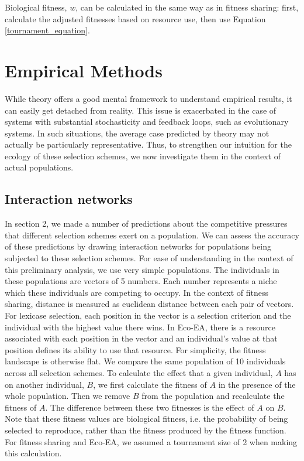 Biological fitness, $w$, can be calculated in the same way as in fitness sharing: first, calculate the adjusted fitnesses based on resource use, then use Equation \ref{tournament_equation}. 

\section{Empirical Methods}

While theory offers a good mental framework to understand empirical results, it can easily get detached from reality. This issue is exacerbated in the case of systems with substantial stochasticity and feedback loops, such as evolutionary systems. In such situations, the average case predicted by theory may not actually be particularly representative. Thus, to strengthen our intuition for the ecology of these selection schemes, we now investigate them in the context of actual populations. 

\subsection{Interaction networks}
In section 2, we made a number of predictions about the competitive pressures that different selection schemes exert on a population. We can assess the accuracy of these predictions by drawing interaction networks for populations being subjected to these selection schemes. For ease of understanding in the context of this preliminary analysis, we use very simple populations. The individuals in these populations are vectors of 5 numbers. Each number represents a niche which these individuals are competing to occupy. In the context of fitness sharing, distance is measured as euclidean distance between each pair of vectors. For lexicase selection, each position in the vector is a selection criterion and the individual with the highest value there wins. In Eco-EA, there is a resource associated with each position in the vector and an individual's value at that position defines its ability to use that resource. For simplicity, the fitness landscape is otherwise flat. We compare the same population of 10 individuals across all selection schemes. To calculate the effect that a given individual, $A$ has on another individual, $B$, we first calculate the fitness of $A$ in the presence of the whole population. Then we remove $B$ from the population and recalculate the fitness of $A$. The difference between these two fitnesses is the effect of $A$ on $B$. Note that these fitness values are biological fitness, i.e. the probability of being selected to reproduce, rather than the fitness produced by the fitness function.  For fitness sharing and Eco-EA, we assumed a tournament size of 2 when making this calculation.

